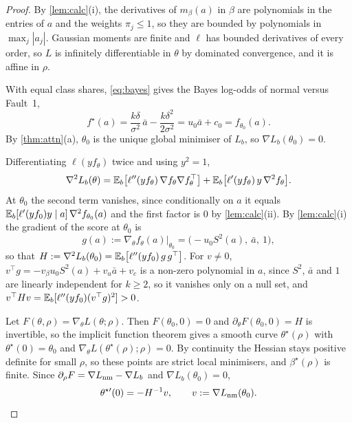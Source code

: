 \begin{proof}
 By \cref{lem:calc}(i), the derivatives of $m_\beta(a)$ in $\beta$ are polynomials in the entries of $a$ and the weights $\pi_j\le1$, so they are bounded by polynomials in $\max_j|a_j|$. Gaussian moments are finite and $\ell$ has bounded derivatives of every order, so $L$ is infinitely differentiable in $\theta$ by dominated convergence, and it is affine in $\rho$.

 With equal class shares, \cref{eq:bayes} gives the Bayes log-odds of normal versus Fault~1,
\begin{equation}\label{eq:f0}
  f^\star(a)=\frac{k\delta}{\sigma^2}\,\bar a-\frac{k\delta^2}{2\sigma^2}=u_0\bar a+c_0=f_{\theta_0}(a).
\end{equation}
By \cref{thm:attn}(a), $\theta_0$ is the unique global minimiser of $L_b$, so $\nabla L_b(\theta_0)=0$.

 Differentiating $\ell(yf_\theta)$ twice and using $y^2=1$,
\begin{equation}\label{eq:hess}
  \nabla^2L_b(\theta)=\mathbb{E}_b\big[\ell''(yf_\theta)\,\nabla f_\theta\nabla f_\theta^\top\big]+\mathbb{E}_b\big[\ell'(yf_\theta)\,y\,\nabla^2f_\theta\big].
\end{equation}
At $\theta_0$ the second term vanishes, since conditionally on $a$ it equals $\mathbb{E}_b[\ell'(yf_0)y\mid a]\,\nabla^2f_{\theta_0}(a)$ and the first factor is $0$ by \cref{lem:calc}(ii). By \cref{lem:calc}(i) the gradient of the score at $\theta_0$ is
\begin{equation}\label{eq:g}
  g(a):=\nabla_\theta f_\theta(a)\big|_{\theta_0}=\big(-u_0S^2(a),\ \bar a,\ 1\big),
\end{equation}
so that $H:=\nabla^2L_b(\theta_0)=\mathbb{E}_b\big[\ell''(yf_0)\,g\,g^\top\big]$. For $v\ne0$, $v^\top g=-v_\beta u_0S^2(a)+v_u\bar a+v_c$ is a non-zero polynomial in $a$, since $S^2$, $\bar a$ and $1$ are linearly independent for $k\ge2$, so it vanishes only on a null set, and $v^\top Hv=\mathbb{E}_b[\ell''(yf_0)(v^\top g)^2]>0$.

 Let $F(\theta,\rho)=\nabla_\theta L(\theta;\rho)$. Then $F(\theta_0,0)=0$ and $\partial_\theta F(\theta_0,0)=H$ is invertible, so the implicit function theorem \citep[Thm.~9.28]{rudin1976} gives a smooth curve $\theta^\star(\rho)$ with $\theta^\star(0)=\theta_0$ and $\nabla_\theta L(\theta^\star(\rho);\rho)=0$. By continuity the Hessian stays positive definite for small $\rho$, so these points are strict local minimisers, and $\beta^\star(\rho)$ is finite. Since $\partial_\rho F=\nabla L_{\mathrm{nm}}-\nabla L_b$ and $\nabla L_b(\theta_0)=0$,
\begin{equation}\label{eq:speed}
  \theta^{\star\prime}(0)=-H^{-1}v,
  \qquad
  v:=\nabla L_{\mathrm{nm}}(\theta_0).
\end{equation}


\end{proof}
